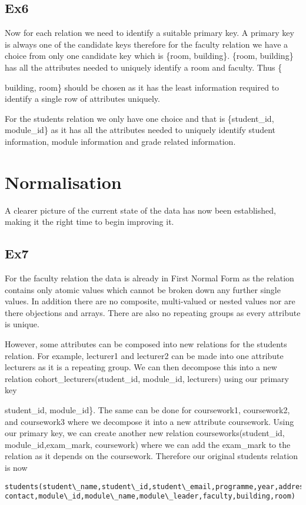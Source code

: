 \documentclass[12pt]{article}
\begin{document}
\subsection{Ex6}
Now for each relation we need to identify a suitable primary key. A primary key is always one of the candidate keys therefore for the faculty relation we have a choice from only one candidate key which is \{room, building\}. \{room, building\} has all the attributes needed to uniquely identify a room and faculty. Thus \{{building, room\} should be chosen as it has the least information required to identify a single row of attributes uniquely.

For the students relation we only have one choice and that is \{student\_id, module\_id\} as it has all the attributes needed to uniquely identify student information, module information and grade related information.
\section{Normalisation}
A clearer picture of the current state of the data has now been established, making it the right time to begin improving it.
\subsection{Ex7}
For the faculty relation the data is already in First Normal Form as the relation contains only atomic values which cannot be broken down any further single values. In addition there are no composite, multi-valued or nested values nor are there objections and arrays. There are also no repeating groups as every attribute is unique. 

However, some attributes can be composed into new relations for the students relation. For example, lecturer1 and lecturer2 can be made into one attribute lecturers as it is a repeating group. We can then decompose this into a new relation cohort\_lecturers(student\_id, module\_id, lecturers) using our primary key {student\_id, module\_id\}. The same can be done for coursework1, coursework2, and coursework3 where we decompose it into a new attribute coursework. Using our primary key, we can create another new relation courseworks(student\_id, module\_id,exam\_mark, coursework) where we can add the exam\_mark to the relation as it depends on the coursework. Therefore our original students relation is now 

\begin{verbatim}
students(student\_name,student\_id,student\_email,programme,year,address,
contact,module\_id,module\_name,module\_leader,faculty,building,room)
\end{verbatim}
}}
\end{document}
